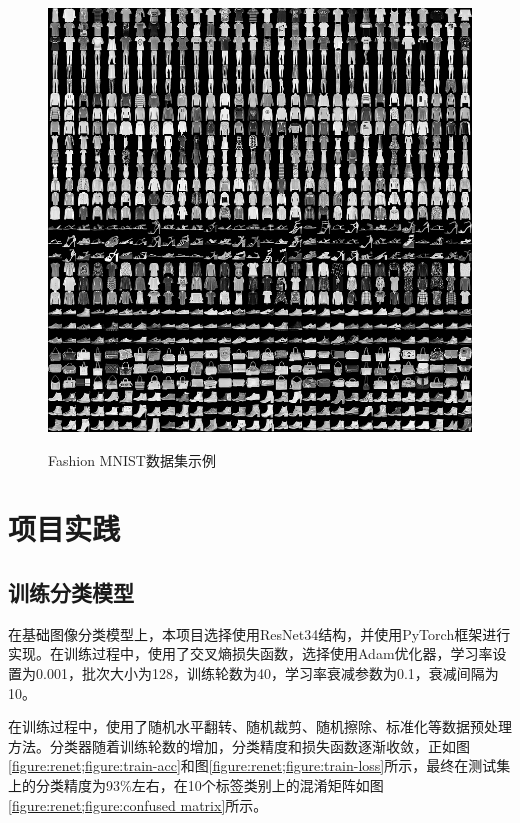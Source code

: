 \documentclass[journal, a4paper]{IEEEtran}
\begin{document}
\begin{figure}[H]\footnotesize
    \centering
    \includegraphics[width=\columnwidth]{../img/demo-fashion-mnist.png}\label{figure:demo fashion mnist}
    \caption{Fashion MNIST数据集示例}
    \label{figure:demo fashion mnist}
\end{figure}

\section{\textbf{项目实践}}
\label{section:experiment}

\subsection{训练分类模型}
\label{section:experiment;subsection:train model}

在基础图像分类模型上，本项目选择使用ResNet34结构，并使用PyTorch框架进行实现。在训练过程中，使用了交叉熵损失函数，选择使用Adam优化器，学习率设置为0.001，批次大小为128，训练轮数为40，学习率衰减参数为0.1，衰减间隔为10。

在训练过程中，使用了随机水平翻转、随机裁剪、随机擦除、标准化等数据预处理方法。分类器随着训练轮数的增加，分类精度和损失函数逐渐收敛，正如图\ref{figure:renet;figure:train-acc}和图\ref{figure:renet;figure:train-loss}所示，最终在测试集上的分类精度为93\%左右，在10个标签类别上的混淆矩阵如图\ref{figure:renet;figure:confused matrix}所示。
\end{document}
